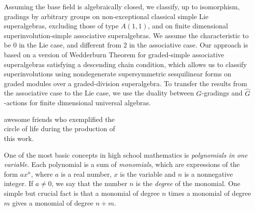%
\begin{prefatory}
\frontpage
\abstract%
    Assuming the base field is algebraically closed, we classify, up to isomorphism, gradings by arbitrary groups on non-exceptional classical simple Lie superalgebras, excluding those of type $A(1,1)$, and on finite dimensional superinvolution-simple associative superalgebras. 
    We assume the characteristic to be $0$ in the Lie case, and different from $2$ in the associative case. 
    Our approach is based on a version of Wedderburn Theorem for graded-simple associative superalgebras satisfying a descending chain condition, which allows us to classify superinvolutions using nondegenerate supersymmetric sesquilinear forms on graded modules over a graded-division superalgebra. 
    To transfer the results from the associative case to the Lie case, we use the duality between $G$-gradings and $\widehat G$-actions for finite dimensional universal algebras. 
\dedication%
{\flushright
To Ruth Roy and Dauto Kean Dos Santos,\\ 
}
\medskip
\hfill \begin{minipage}[t]{0.46\textwidth}
awesome friends who exemplified the\\ circle of life 
during the production of\\ 
this work.
\end{minipage}


\laysummary %

One of the most basic concepts in high school mathematics is \emph{polynomials in one variable}. 
Each polynomial is a sum of \emph{monomials}, which are expressions of the form $a x^n$, where $a$ is a real number, $x$ is the variable and $n$ is a nonnegative integer. 
If $a \neq 0$, we say that the number $n$ is the \emph{degree} of the monomial. 
One simple but crucial fact is that a monomial of degree $n$ times a monomial of degree $m$ gives a monomial of degree $n + m$. 


\end{prefatory}
